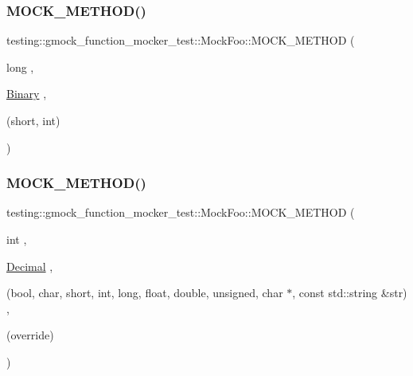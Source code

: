 \mbox{\label{classtesting_1_1gmock__function__mocker__test_1_1_mock_foo_a9d6597b94797dfeb1061ad7a48bbc141}} 
\subsubsection{\texorpdfstring{MOCK\_METHOD()}{MOCK\_METHOD()}\hspace{0.1cm}{\footnotesize\ttfamily [8/38]}}
{\footnotesize\ttfamily testing\+::gmock\+\_\+function\+\_\+mocker\+\_\+test\+::\+Mock\+Foo\+::\+M\+O\+C\+K\+\_\+\+M\+E\+T\+H\+OD (\begin{DoxyParamCaption}\item[{long}]{,  }\item[{\mbox{\hyperlink{classtesting_1_1gmock__function__mocker__test_1_1_foo_interface_a8d6e54401a3addca464903257529ace4}{Binary}}}]{,  }\item[{(short, int)}]{ }\end{DoxyParamCaption})}

\mbox{\label{classtesting_1_1gmock__function__mocker__test_1_1_mock_foo_ab6783427c5fb99f8a9c25fba9210c748}} 
\subsubsection{\texorpdfstring{MOCK\_METHOD()}{MOCK\_METHOD()}\hspace{0.1cm}{\footnotesize\ttfamily [9/38]}}
{\footnotesize\ttfamily testing\+::gmock\+\_\+function\+\_\+mocker\+\_\+test\+::\+Mock\+Foo\+::\+M\+O\+C\+K\+\_\+\+M\+E\+T\+H\+OD (\begin{DoxyParamCaption}\item[{int}]{,  }\item[{\mbox{\hyperlink{classtesting_1_1gmock__function__mocker__test_1_1_foo_interface_a2a415a61b9a9c7a69bba9a4b5ef2a63e}{Decimal}}}]{,  }\item[{(bool, char, short, int, long, float, double, unsigned, char $\ast$, const std\+::string \&str)}]{,  }\item[{(override)}]{ }\end{DoxyParamCaption})}

